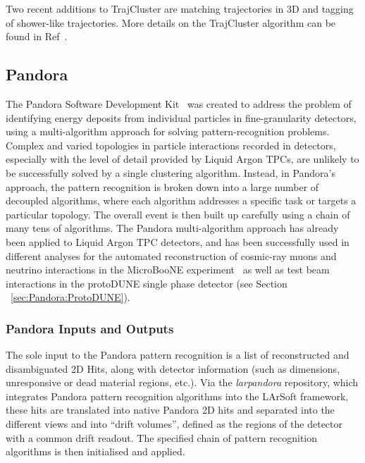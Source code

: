 Two recent additions to TrajCluster are matching trajectories in 3D and tagging of shower-like trajectories. More details on the TrajCluster algorithm can be found in Ref~\cite{ref:trajcluster}.



\subsection{Pandora}\label{sec:Pandora}

The Pandora Software Development Kit~\cite{Marshall:2015rfa} was created to address the problem of identifying energy deposits from individual particles in fine-granularity detectors, using a multi-algorithm approach for solving pattern-recognition problems. Complex and varied topologies in particle interactions recorded in detectors, especially with the level of detail provided by Liquid Argon TPCs, are unlikely to be successfully solved by a single clustering algorithm. Instead, in Pandora's approach, the pattern recognition is broken down into a large number of decoupled algorithms, where each algorithm addresses a specific task or targets a particular topology. The overall event is then built up carefully using a chain of many tens of algorithms. The Pandora multi-algorithm approach has already been applied to Liquid Argon TPC detectors, and has been successfully used in different analyses for the automated reconstruction of cosmic-ray muons and neutrino interactions in the MicroBooNE experiment~\cite{Acciarri:2017hat} as well as test beam interactions in the protoDUNE single phase detector (see Section ~\ref{sec:Pandora:ProtoDUNE}).


\subsubsection{Pandora Inputs and Outputs}

The sole input to the Pandora pattern recognition is a list of reconstructed and disambiguated 2D Hits, along with detector information (such as dimensions, unresponsive or dead material regions, etc.). Via the {\it larpandora} repository, which integrates Pandora pattern recognition algorithms into the LArSoft framework, these hits are translated into native Pandora 2D hits and separated into the different views and into ``drift volumes'', defined as the regions of the detector with a common drift readout. The specified chain of pattern recognition algorithms is then initialised and applied. 

